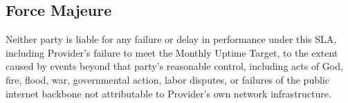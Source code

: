 \subsection{Force Majeure}
\label{sec:force-majeure}
Neither party is liable for any failure or delay in performance under this SLA, including Provider's failure to meet the Monthly Uptime Target, to the extent caused by events beyond that party's reasonable control, including acts of God, fire, flood, war, governmental action, labor disputes, or failures of the public internet backbone not attributable to Provider's own network infrastructure.
